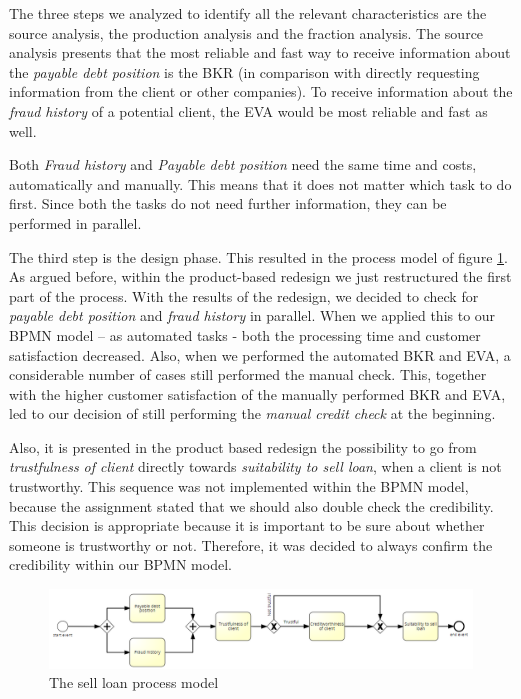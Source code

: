 \documentclass[a4paper]{article} %
\begin{document}
The three steps we analyzed to identify all the relevant characteristics are the source analysis, the production analysis and the fraction analysis. The source analysis presents that the most reliable and fast way to receive information about the \textit{payable debt position} is the BKR \cite{ABN} (in comparison with directly requesting information from the client or other companies). To receive information about the \textit{fraud history} of a potential client, the EVA would be most reliable and fast as well.

Both \textit{Fraud history} and \textit{Payable debt position} need the same time and costs, automatically and manually. This means that it does not matter which task to do first. Since both the tasks do not need further information, they can be performed in parallel.

The third step is the design phase. This resulted in the process model of figure \ref{BPM1}. As argued before, within the product-based redesign we just restructured the first part of the process. With the results of the redesign, we decided to check for \textit{payable debt position} and \textit{fraud history}  in  parallel. When we applied this to our BPMN model – as automated tasks - both the processing time and customer satisfaction decreased. Also, when we performed the automated BKR and EVA, a considerable number of cases still performed the manual check. This, together with the higher customer satisfaction of the manually performed BKR and EVA, led to our decision of still performing the \textit{manual credit check} at the beginning.

Also, it is presented in the product based redesign the possibility to go from \textit{trustfulness of client} directly towards \textit{suitability to sell loan}, when a client is not trustworthy. This sequence was not implemented within the BPMN model, because the assignment stated that we should also double check the credibility. This decision is appropriate because it is important to be sure about whether someone is trustworthy or not. Therefore, it was decided to always confirm the credibility within our BPMN model.\\
\begin{figure}[H]
\centering
\includegraphics[scale=0.65]{BPM1}
\caption{The sell loan process model}
\label{BPM1}
\end{figure}
\end{document}
